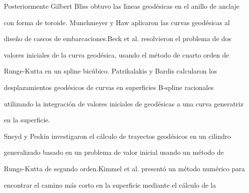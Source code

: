 \documentclass[a4paper,portrait,12pt]{article}
\begin{document}
\begin{flushleft}
Posteriormente Gilbert Bliss obtuvo las l\i{}́neas geodésicas en el anillo de anclaje
\end{flushleft}


\begin{flushleft}
con forma de toroide. Munchmeyer y Haw aplicaron las curvas geodésicas al
\end{flushleft}


\begin{flushleft}
diseño de cascos de embarcaciones.Beck et al. resolvieron el problema de dos
\end{flushleft}


\begin{flushleft}
valores iniciales de la curva geodésica, usando el método de cuarto orden de
\end{flushleft}


\begin{flushleft}
Runge-Kutta en un spline bicúbico. Patrikalakis y Bardis calcularon los
\end{flushleft}


\begin{flushleft}
desplazamientos geodésicos de curvas en superficies B-spline racionales
\end{flushleft}


\begin{flushleft}
utilizando la integración de valores iniciales de geodésicas a una curva generatriz
\end{flushleft}


\begin{flushleft}
en la superficie.
\end{flushleft}


\begin{flushleft}
Sneyd y Peskin investigaron el cálculo de trayectos geodésicos en un cilindro
\end{flushleft}


\begin{flushleft}
generalizado basado en un problema de valor inicial usando un método de
\end{flushleft}


\begin{flushleft}
Runge-Kutta de segundo orden.Kimmel et al. presentó un método numérico para
\end{flushleft}


\begin{flushleft}
encontrar el camino más corto en la superficie mediante el cálculo de la
\end{flushleft}
\end{document}

